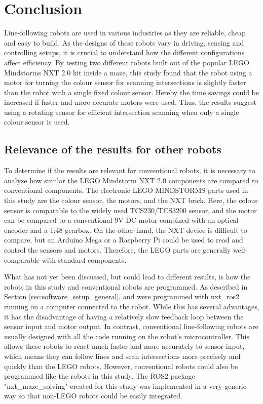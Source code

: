 \section{Conclusion} \label{sec:conclusion}

Line-following robots are used in various industries as they are reliable, cheap and easy to build. As the designs of these robots vary in driving, sensing and controlling setups, it is crucial to understand how the different configurations affect efficiency. By testing two different robots built out of the popular LEGO Mindstorms NXT 2.0 kit inside a maze, this study found that the robot using a motor for turning the colour sensor for scanning intersections is slightly faster than the robot with a single fixed colour sensor. Hereby the time savings could be increased if faster and more accurate motors were used. Thus, the results suggest using a rotating sensor for efficient intersection scanning when only a single colour sensor is used.

\subsection{Relevance of the results for other robots}

To determine if the results are relevant for conventional robots, it is necessary to analyze how similar the LEGO Mindstorm NXT 2.0 components are compared to conventional components. The electronic LEGO MINDSTORMS parts used in this study are the colour sensor, the motors, and the NXT brick. Here, the colour sensor is comparable to the widely used TCS230/TCS3200 sensor, and the motor can be compared to a conventional 9V DC motor combined with an optical encoder and a 1:48 gearbox. On the other hand, the NXT device is difficult to compare, but an Arduino Mega or a Raspberry Pi could be used to read and control the sensors and motors. Therefore, the LEGO parts are generally well-comparable with standard components.

What has not yet been discussed, but could lead to different results, is how the robots in this study and conventional robots are programmed. As described in Section \ref{sec:software_setup_general}, \FixRob and \TurnRob were programmed with nxt\_ros2 running on a computer connected to the robot. While this has several advantages, it has the disadvantage of having a relatively slow feedback loop between the sensor input and motor output. In contrast, conventional line-following robots are usually designed with all the code running on the robot's microcontroller. This allows these robots to react much faster and more accurately to sensor input, which means they can follow lines and scan intersections more precisely and quickly than the LEGO robots. However, conventional robots could also be programmed like the robots in this study. The ROS2 package "nxt\_maze\_solving" created for this study was implemented in a very generic way so that non-LEGO robots could be easily integrated.

